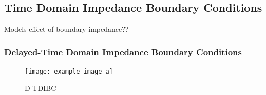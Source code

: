 











\subsection{Time Domain Impedance Boundary Conditions}


Models effect of boundary impedance??


\subsubsection{Delayed-Time Domain Impedance Boundary Conditions}

\begin{figure}[t]
\centering
\texttt{[image: example-image-a]}
\caption{D-TDIBC}
\label{fig:D-TDIBC}
\end{figure}
        
